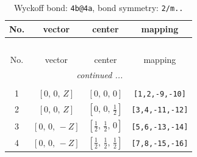 \documentclass[fleqn,8pt]{jsarticle}
\begin{document}
\begin{longtable}{cccc}
\caption{Wyckoff bond: {\tt 4b@4a}, bond symmetry: {\tt 2/m..}}
 \\
 \hline \hline
No. & vector & center & mapping \\ \hline \endfirsthead

\multicolumn{3}{l}{\tablename\ \thetable{}} \\
 \hline \hline
No. & vector & center & mapping \\ \hline \endhead

 \hline \hline
\multicolumn{3}{r}{\footnotesize\it continued ...} \\ \endfoot

 \hline \hline
\multicolumn{3}{r}{} \\ \endlastfoot

1 & $\left[ 0,\, 0,\, Z \right]$ & $\left[ 0,\, 0,\, 0 \right]$ & {\tt [1,2,-9,-10]} \\ \hline
2 & $\left[ 0,\, 0,\, Z \right]$ & $\left[ 0,\, 0,\, \frac{1}{2} \right]$ & {\tt [3,4,-11,-12]} \\ \hline
3 & $\left[ 0,\, 0,\, - Z \right]$ & $\left[ \frac{1}{2},\, \frac{1}{2},\, 0 \right]$ & {\tt [5,6,-13,-14]} \\ \hline
4 & $\left[ 0,\, 0,\, - Z \right]$ & $\left[ \frac{1}{2},\, \frac{1}{2},\, \frac{1}{2} \right]$ & {\tt [7,8,-15,-16]} \\
\end{longtable}
\renewcommand{\arraystretch}{1.2}
\end{document}
